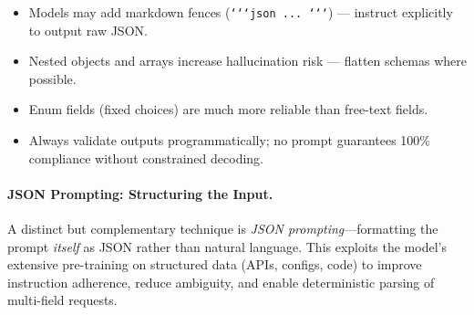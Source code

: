 \begin{warningbox}
\begin{itemize}
  \item Models may add markdown fences (\texttt{‘‘‘json ... ‘‘‘}) --- instruct explicitly to output raw JSON.
  \item Nested objects and arrays increase hallucination risk --- flatten schemas where possible.
  \item Enum fields (fixed choices) are much more reliable than free-text fields.
  \item Always validate outputs programmatically; no prompt guarantees 100\% compliance without constrained decoding.
\end{itemize}
\end{warningbox}

\paragraph{JSON Prompting: Structuring the Input.}
\label{json-prompting-structuring-the-input.}

A distinct but complementary technique is \emph{JSON prompting}---formatting the prompt \emph{itself} as JSON rather than natural language. This exploits the model’s extensive pre-training on structured data (APIs, configs, code) to improve instruction adherence, reduce ambiguity, and enable deterministic parsing of multi-field requests.


